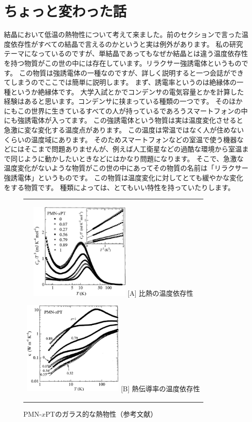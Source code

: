 \documentclass[10pt,b5paper,papersize,dvipdfmx]{jsbook}
\begin{document}
\section{ちょっと変わった話}
結晶において低温の熱物性について考えて来ました。前のセクションで言った温度依存性がすべての結晶で言えるのかというと実は例外があります。
私の研究テーマになっているのですが、単結晶であってもなぜか結晶とは違う温度依存性を持つ物質がこの世の中には存在しています。リラクサー強誘電体というものです。
この物質は強誘電体の一種なのですが、詳しく説明すると一つ会誌ができてしまうのでここでは簡単に説明します。
まず、誘電率というのは絶縁体の一種というか絶縁体です。
大学入試とかでコンデンサの電気容量とかを計算した経験はあると思います。コンデンサに挟まっている種類の一つです。
そのほかにもこの世界に生きているすべての人が持っているであろうスマートフォンの中にも強誘電体が入ってます。
この強誘電体という物質は実は温度変化させると急激に変な変化する温度点があります。
この温度は常温ではなく人が住めないくらいの温度域にあります。
そのためスマートフォンなどの室温で使う機器などにはそこまで問題ありませんが、例えば人工衛星などの過酷な環境から室温まで同じように動かしたいときなどにはかなり問題になります。
そこで、急激な温度変化がないような物質がこの世の中にあってその物質の名前は「リラクサー強誘電体」というものです。
この物質は温度変化に対してとても緩やかな変化をする物質です。
種類によっては、とてもいい特性を持っていたりします。
\begin{figure}[htbp]
  \centering
  \begin{tabular}{c}
    \begin{minipage}{0.5\hsize}
      \centering
      \includegraphics[clip, width=5cm]{img/relaxor-heat-capacity.pdf}
      \hspace{1.6cm} [A] 比熱の温度依存性
    \end{minipage}
    \begin{minipage}{0.5\hsize}
      \centering
      \includegraphics[clip, width=5cm]{img/relaxor-thermal-conductivity.pdf}
      \hspace{1.6cm} [B] 熱伝導率の温度依存性
    \end{minipage}
  \end{tabular}
  \caption{PMN-$x$PTのガラス的な熱物性（参考文献\cite{relaxCT}）}
  \label{fig:lena}
\end{figure}
\end{document}
